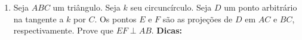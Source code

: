 \documentclass{article}
\newcommand{\dica}{\textbf{Dicas:}}
\newcommand{\iniTri}{Seja $ABC$ um triângulo}
\begin{document}
\begin{multicols}{2}
\begin{enumerate}
    \item \iniTri. Seja $k$ seu circuncírculo. Seja $D$ um ponto arbitrário na tangente a $k$ por $C$. Os pontos $E$ e $F$ são as projeções de $D$ em $AC$ e $BC$, respectivamente. Prove que $EF\perp AB$. \dica %
    
    
    
    
    
    
    
    
    
    
    
    
    
    
    
    
    
    
    
\end{enumerate}
\end{multicols}
\end{document}
